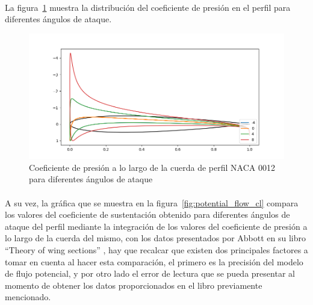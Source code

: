 \documentclass[letterpaper, openright, 12pt]{book}
\begin{document}
    \paragraph*{}
    La figura~\ref{fig:potential_flow_cp_dist} muestra la distribución del
    coeficiente de presión en el perfil para diferentes ángulos de ataque.
    \begin{figure}[H]%
        \centering
        \includegraphics[keepaspectratio,
            width=138mm]{./Imagenes/potential_flow_cps}
        \caption[Coeficiente de presión a lo largo de la cuerda de perfil NACA 0012]
        {Coeficiente de presión a lo largo de la cuerda de perfil NACA 0012 para
            diferentes ángulos de ataque}
        \label{fig:potential_flow_cp_dist}
    \end{figure}

    \paragraph*{}
    A su vez, la gráfica que se muestra en la figura~\ref{fig:potential_flow_cl}
    compara los valores del coeficiente de sustentación obtenido para diferentes
    ángulos de ataque del perfil mediante la integración de los valores del
    coeficiente de presión a lo largo de la cuerda del mismo, con los datos
    presentados por Abbott en su libro ``Theory of wing sections''
    \cite{abbott}, hay que recalcar que existen dos principales factores a tomar
    en cuenta al hacer esta comparación, el primero es la precisión del modelo
    de flujo potencial, y por otro lado el error de lectura que se pueda
    presentar al momento de obtener los datos proporcionados en el libro
    previamente mencionado.
\end{document}
